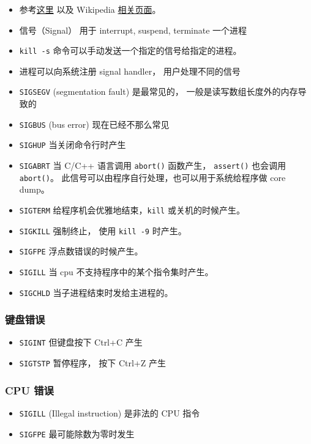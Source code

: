 
\begin{issues}
\issueDraft
\end{issues}

\begin{itemize}
\item 参考\href{https://unix.stackexchange.com/questions/6332/what-causes-various-signals-to-be-sent}{这里} 以及 Wikipedia \href{https://en.wikipedia.org/wiki/Signal_(IPC)}{相关页面}。
\item 信号（Signal） 用于 interrupt, suspend, terminate 一个进程
\item \verb|kill -s| 命令可以手动发送一个指定的信号给指定的进程。
\item 进程可以向系统注册 signal handler， 用户处理不同的信号
\item \verb|SIGSEGV| (segmentation fault) 是最常见的， 一般是读写数组长度外的内存导致的
\item \verb|SIGBUS| (bus error) 现在已经不那么常见
\item \verb|SIGHUP| 当关闭命令行时产生
\item \verb|SIGABRT| 当 C/C++ 语言调用 \verb|abort()| 函数产生， \verb|assert()| 也会调用 \verb|abort()|。 此信号可以由程序自行处理，也可以用于系统给程序做 core dump。
\item \verb|SIGTERM| 给程序机会优雅地结束，\verb|kill| 或关机的时候产生。
\item \verb|SIGKILL| 强制终止， 使用 \verb|kill -9| 时产生。
\item \verb|SIGFPE| 浮点数错误的时候产生。
\item \verb|SIGILL| 当 cpu 不支持程序中的某个指令集时产生。
\item \verb|SIGCHLD| 当子进程结束时发给主进程的。
\end{itemize}

\subsubsection{键盘错误}
\begin{itemize}
\item \verb|SIGINT| 但键盘按下 Ctrl+C 产生
\item \verb|SIGTSTP| 暂停程序， 按下 Ctrl+Z 产生
\end{itemize}

\subsubsection{CPU 错误}
\begin{itemize}
\item \verb|SIGILL| (Illegal instruction) 是非法的 CPU 指令
\item \verb|SIGFPE| 最可能除数为零时发生
\end{itemize}

